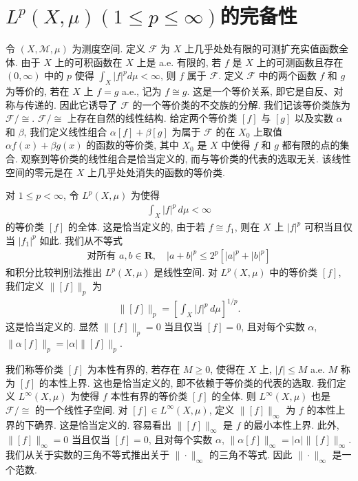 \documentclass[../../main.tex]{subfiles}
\begin{document}
\section{$L^{p}(X,\mu)(1\leqslant p\leqslant\infty)$的完备性}\label{section:ch19-completeness}

令 $(X,\mathcal{M},\mu)$ 为测度空间. 定义 $\mathcal{F}$ 为 $X$ 上几乎处处有限的可测扩充实值函数全体. 由于 $X$ 上的可积函数在 $X$ 上是 a.e. 有限的, 若 $f$ 是 $X$ 上的可测函数且存在 $(0,\infty)$ 中的 $p$ 使得 $\int_{X}|f|^{p}d\mu<\infty$, 则 $f$ 属于 $\mathcal{F}$. 定义 $\mathcal{F}$ 中的两个函数 $f$ 和 $g$ 为等价的, 若在 $X$ 上 $f=g$ a.e., 记为 $f\cong g$. 这是一个等价关系, 即它是自反、对称与传递的. 因此它诱导了 $\mathcal{F}$ 的一个等价类的不交族的分解. 我们记该等价类族为 $\mathcal{F}/\cong$. $\mathcal{F}/\cong$ 上存在自然的线性结构. 给定两个等价类 $[f]$ 与 $[g]$ 以及实数 $\alpha$ 和 $\beta$, 我们定义线性组合 $\alpha[f]+\beta[g]$ 为属于 $\mathcal{F}$ 的在 $X_{0}$ 上取值 $\alpha f(x)+\beta g(x)$ 的函数的等价类, 其中 $X_{0}$ 是 $X$ 中使得 $f$ 和 $g$ 都有限的点的集合. 观察到等价类的线性组合是恰当定义的, 而与等价类的代表的选取无关. 该线性空间的零元是在 $X$ 上几乎处处消失的函数的等价类.

对 $1\leqslant p<\infty$, 令 $L^{p}(X,\mu)$ 为使得
\begin{align*}
\int_{X}|f|^{p}\,d\mu<\infty
\end{align*}
的等价类 $[f]$ 的全体. 这是恰当定义的, 由于若 $f\cong f_{1}$, 则在 $X$ 上 $|f|^{p}$ 可积当且仅当 $|f_{1}|^{p}$ 如此. 我们从不等式
\begin{align*}
\text{对所有 }a,b\in\mathbf{R},\quad|a+b|^{p}\leqslant 2^{p}[|a|^{p}+|b|^{p}]
\end{align*}
和积分比较判别法推出 $L^{p}(X,\mu)$ 是线性空间. 对 $L^{p}(X,\mu)$ 中的等价类 $[f]$, 我们定义 $\|[f]\|_{p}$ 为
\begin{align*}
\|[f]\|_{p}=\left[\int_{X}|f|^{p}\,d\mu\right]^{1/p}.
\end{align*}
这是恰当定义的. 显然 $\|[f]\|_{p}=0$ 当且仅当 $[f]=0$, 且对每个实数 $\alpha$, $\|\alpha[f]\|_{p}=|\alpha|\|[f]\|_{p}$.

我们称等价类 $[f]$ 为本性有界的, 若存在 $M\geqslant 0$, 使得在 $X$ 上, $|f|\leqslant M$ a.e. $M$ 称为 $[f]$ 的本性上界. 这也是恰当定义的, 即不依赖于等价类的代表的选取. 我们定义 $L^{\infty}(X,\mu)$ 为使得 $f$ 本性有界的等价类 $[f]$ 的全体. 则 $L^{\infty}(X,\mu)$ 也是 $\mathcal{F}/\cong$ 的一个线性子空间. 对 $[f]\in L^{\infty}(X,\mu)$, 定义 $\|[f]\|_{\infty}$ 为 $f$ 的本性上界的下确界. 这是恰当定义的. 容易看出 $\|[f]\|_{\infty}$ 是 $f$ 的最小本性上界. 此外, $\|[f]\|_{\infty}=0$ 当且仅当 $[f]=0$, 且对每个实数 $\alpha$, $\|\alpha[f]\|_{\infty}=|\alpha|\|[f]\|_{\infty}$. 我们从关于实数的三角不等式推出关于 $\|\cdot\|_{\infty}$ 的三角不等式. 因此 $\|\cdot\|_{\infty}$ 是一个范数.
\end{document}
